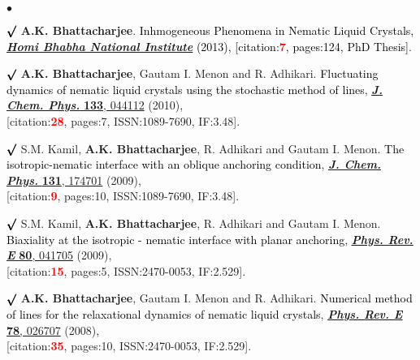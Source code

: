\documentclass[margin,line]{res}
\newenvironment{list2}{
  \begin{list}{$\bullet$}{%
      \setlength{\itemsep}{0in}
      \setlength{\parsep}{0in} \setlength{\parskip}{0in}
      \setlength{\topsep}{0in} \setlength{\partopsep}{0in} 
      \setlength{\leftmargin}{0.2in}}}{\end{list}}
\begin{document}
\begin{resume}
\begin{list2}
\vspace{4mm}
\item[$\pmb\surd$] {\bf A.K. Bhattacharjee}. \textcolor{black}{\textsf{Inhmogeneous Phenomena in Nematic Liquid Crystals},\\ 
\href{http://www.hbni.ac.in/students/dsp_ths.html?nm=phys/PHYS10200604009.pdf}{\underline{\textbf{\textit{Homi Bhabha National Institute}}}} (2013), {[citation:\textcolor{red}{\bf 7}, pages:124, PhD Thesis]}}. 
\vspace{4mm}
\item[$\pmb\surd$] {\bf A.K. Bhattacharjee}, Gautam I. Menon and R. Adhikari. \textcolor{black}{\textsf{Fluctuating dynamics of 
nematic liquid crystals using the stochastic method of lines}}, \href{https://aip.scitation.org/doi/abs/10.1063/1.3455206}{\underline{\textit{\textbf{J. Chem. Phys.}}} {\bf 133}, 044112} (2010), \\{[citation:\textcolor{red}{\bf 28}, pages:7, ISSN:1089-7690, IF:3.48]}.
\vspace{4mm}
\item[$\pmb\surd$] S.M. Kamil, {\bf A.K. Bhattacharjee}, R. Adhikari and Gautam I. Menon. \textcolor{black}{\textsf{The isotropic-nematic 
interface with an oblique anchoring condition}}, \href{https://aip.scitation.org/doi/abs/10.1063/1.3253702}{\underline{\textit{\textbf{J. Chem. Phys.}}} 
{\bf 131}, 174701} (2009), \\{[citation:\textcolor{red}{\bf 9}, pages:10, ISSN:1089-7690, IF:3.48]}. 
\vspace{4mm}
\item[$\pmb\surd$] S.M. Kamil, {\bf A.K. Bhattacharjee}, R. Adhikari and Gautam I. Menon. \textcolor{black}{\textsf{Biaxiality at the 
isotropic - nematic interface with planar anchoring}}, \href{http://pre.aps.org/abstract/PRE/v80/i4/e041705}{\underline{\textit{\textbf{ Phys. Rev. E} }}
{\bf 80}, 041705} (2009), \\{[citation:\textcolor{red}{\bf 15}, pages:5, ISSN:2470-0053, IF:2.529]}.
\vspace{4mm}
\item[$\pmb\surd$] {\bf A.K. Bhattacharjee}, Gautam I. Menon and R. Adhikari. \textcolor{black}{\textsf{Numerical method of lines for 
the relaxational dynamics of nematic liquid crystals}}, \href{http://pre.aps.org/abstract/PRE/v78/i2/e026707}{\underline{\textit{\textbf{Phys. Rev. E}}}
{\bf 78}, 026707} (2008), \\{[citation:\textcolor{red}{\bf 35}, pages:10, ISSN:2470-0053, IF:2.529]}.
\end{list2}

\end{resume}
\end{document}
